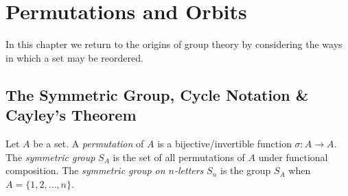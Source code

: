\graphicspath{{5perm/asy/}}
\setcounter{section}{3}

\section{Permutations and Orbits}\label{chap:perm}

In this chapter we return to the origins of group theory by considering the ways in which a set may be reordered.

\subsection{The Symmetric Group, Cycle Notation \& Cayley's Theorem}\label{sec:perm1}

\begin{defn}{}{}
	Let $A$ be a set. A \emph{permutation} of $A$ is a bijective/invertible function $\sigma:A\to A$.\smallbreak
	The \emph{symmetric group} $S_A$ is the set of all permutations of $A$ under functional composition.\smallbreak
	The \emph{symmetric group on $n$-letters\footnotemark} $S_n$ is the group $S_A$ when $A=\{1,2,\ldots,n\}$.
\end{defn}



